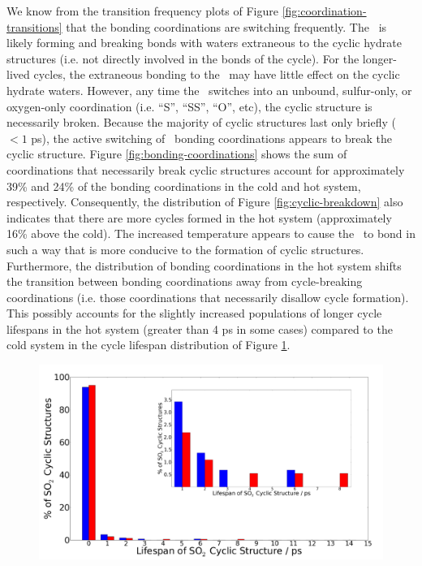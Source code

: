 We know from the transition frequency plots of Figure \ref{fig:coordination-transitions} that the bonding coordinations are switching frequently. The \suldiox~is likely forming and breaking bonds with waters extraneous to the cyclic hydrate structures (i.e. not directly involved in the bonds of the cycle). For the longer-lived cycles, the extraneous bonding to the \suldiox~may have little effect on the cyclic hydrate waters. However, any time the \suldiox~switches into an unbound, sulfur-only, or oxygen-only coordination (i.e. ``S'', ``SS'', ``O'', etc), the cyclic structure is necessarily broken. Because the majority of cyclic structures last only briefly ($<1$ ps), the active switching of \suldiox~bonding coordinations appears to break the cyclic structure. Figure \ref{fig:bonding-coordinations} shows the sum of coordinations that necessarily break cyclic structures account for approximately 39\% and 24\% of the bonding coordinations in the cold and hot system, respectively. Consequently, the distribution of Figure \ref{fig:cyclic-breakdown} also indicates that there are more cycles formed in the hot system (approximately 16\% above the cold). The increased temperature appears to cause the \suldiox~to bond in such a way that is more conducive to the formation of cyclic structures. Furthermore, the distribution of bonding coordinations in the hot system shifts the transition between bonding coordinations away from cycle-breaking coordinations (i.e. those coordinations that necessarily disallow cycle formation). This possibly accounts for the slightly increased populations of longer cycle lifespans in the hot system (greater than 4 ps in some cases) compared to the cold system in the cycle lifespan distribution of Figure \ref{fig:cycle-lifespans}. 

\begin{figure}[h!]
	\begin{center}
		\includegraphics[scale=1.0]{images/cycles/cyclic-lifespans-inset-small.png}
		\caption{}
		\label{fig:cycle-lifespans}
	\end{center}
\end{figure}
